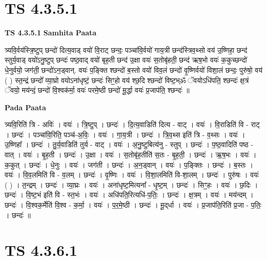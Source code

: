 \documentclass[17pt]{extarticle}
\begin{document}
\section*{ TS 4.3.5.1 }

\textbf{TS 4.3.5.1 } \newline
\textbf{Samhita Paata} \newline

त्र्यवि॒र्वय॑स्त्रि॒ष्टुप् छन्दो॑ दित्य॒वाड् वयो॑ वि॒राट् छन्दः॒ पञ्चा॑वि॒र्वयो॑ गाय॒त्री छन्द॑स्त्रिव॒थ्सो वय॑ उ॒ष्णिहा॒ छन्द॑ स्तुर्य॒वाड् वयो॑ऽनु॒ष्टुप् छन्दः॑ पष्ठ॒वाद् वयो॑ बृह॒ती छन्द॑ उ॒क्षा वयः॑ स॒तोबृ॑हती॒ छन्द॑ ऋष॒भो वयः॑ क॒कुच्छन्दो॑ धे॒नुर्वयो॒ जग॑ती॒ छन्दो॑ऽन॒ड्वान्. वयः॑ प॒ङ्क्ति श्छन्दो॑ ब॒स्तो वयो॑ विव॒लं छन्दो॑ वृ॒ष्णिर्वयो॑ विशा॒लं छन्दः॒ पुरु॑षो॒ वय॑ ( ) स्त॒न्द्रं छन्दो᳚ व्या॒घ्रो वयोऽना॑धृष्टं॒ छन्दः॑ सिꣳ॒॒हो वय॑ श्छ॒दि श्छन्दो॑ विष्ट॒भ्ॐ ॅवयोऽधि॑पति॒ श्छन्दः॑ क्ष॒त्रं ॅवयो॒ मय॑न्दं॒ छन्दो॑ वि॒श्वक॑र्मा॒ वयः॑ परमे॒ष्ठी छन्दो॑ मू॒र्द्धा वयः॑ प्र॒जाप॑ति॒ श्छन्दः॑ ॥ \newline

\textbf{Pada Paata} \newline

त्र्यवि॒रिति॑ त्रि - अविः॑ । वयः॑ । त्रि॒ष्टुप् । छन्दः॑ । दि॒त्य॒वाडिति॑ दित्य - वाट् । वयः॑ । वि॒राडिति॑ वि - राट् । छन्दः॑ । पञ्चा॑वि॒रिति॒ पञ्च॑-अ॒विः॒ । वयः॑ । गा॒य॒त्री । छन्दः॑ । त्रि॒व॒थ्स इति॑ त्रि - व॒थ्सः । वयः॑ । उ॒ष्णिहा᳚ । छन्दः॑ । तु॒र्य॒वाडिति॑ तुर्य - वाट् । वयः॑ । अ॒नु॒ष्टुबित्य॑नु - स्तुप् । छन्दः॑ । प॒ष्ठ॒वादिति॑ पष्ठ - वात् । वयः॑ । बृ॒ह॒ती । छन्दः॑ । उ॒क्षा । वयः॑ । स॒तोबृ॑ह॒तीति॑ स॒तः - बृ॒ह॒ती॒ । छन्दः॑ । ऋ॒ष॒भः । वयः॑ । क॒कुत् । छन्दः॑ । धे॒नुः । वयः॑ । जग॑ती । छन्दः॑ । अ॒न॒ड्वान् । वयः॑ । प॒ङ्क्तिः । छन्दः॑ । ब॒स्तः । वयः॑ । वि॒व॒लमिति॑ वि - व॒लम् । छन्दः॑ । वृ॒ष्णिः । वयः॑ । वि॒शा॒लमिति॑ वि-शा॒लम् । छन्दः॑ । पुरु॑षः । वयः॑ ( ) । त॒न्द्रम् । छन्दः॑ । व्या॒घ्रः । वयः॑ । अना॑धृष्ट॒मित्यना᳚ - धृ॒ष्ट॒म् । छन्दः॑ । सिꣳ॒॒हः । वयः॑ । छ॒दिः । छन्दः॑ । वि॒ष्ट॒भं इति॑ वि - स्त॒भंः । वयः॑ । अधि॑पति॒रित्यधि॑-प॒तिः॒ । छन्दः॑ । क्ष॒त्रम् । वयः॑ । मय॑न्दम् । छन्दः॑ । वि॒श्वक॒र्मेति॑ वि॒श्व - क॒र्मा॒ । वयः॑ । प॒र॒मे॒ष्ठी । छन्दः॑ । मू॒द्‌र्धा । वयः॑ । प्र॒जाप॑ति॒रिति॑ प्र॒जा - प॒तिः॒ । छन्दः॑ ॥  \newline




\section*{ TS 4.3.6.1 }
\end{document}
